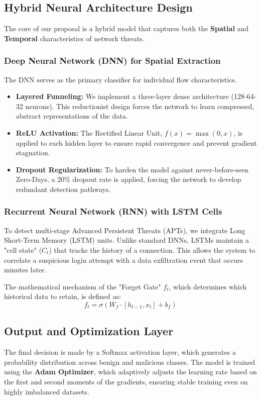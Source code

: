 \documentclass[10pt, conference, compsocconf, letterpaper, twocolumn, twoside]{IEEEtran}
\begin{document}
\subsection{Hybrid Neural Architecture Design}
The core of our proposal is a hybrid model that captures both the \textbf{Spatial} and \textbf{Temporal} characteristics of network threats.

\subsubsection{Deep Neural Network (DNN) for Spatial Extraction}
The DNN serves as the primary classifier for individual flow characteristics. 
\begin{itemize}
    \item \textbf{Layered Funneling:} We implement a three-layer dense architecture (128-64-32 neurons). This reductionist design forces the network to learn compressed, abstract representations of the data.
    \item \textbf{ReLU Activation:} The Rectified Linear Unit, $f(x) = \max(0, x)$, is applied to each hidden layer to ensure rapid convergence and prevent gradient stagnation.
    \item \textbf{Dropout Regularization:} To harden the model against never-before-seen Zero-Days, a 20\% dropout rate is applied, forcing the network to develop redundant detection pathways.
\end{itemize}

\subsubsection{Recurrent Neural Network (RNN) with LSTM Cells}
To detect multi-stage Advanced Persistent Threats (APTs), we integrate Long Short-Term Memory (LSTM) units. Unlike standard DNNs, LSTMs maintain a "cell state" ($C_t$) that tracks the history of a connection. This allows the system to correlate a suspicious login attempt with a data exfiltration event that occurs minutes later. 

The mathematical mechanism of the "Forget Gate" $f_t$, which determines which historical data to retain, is defined as:
\begin{equation}
f_t = \sigma(W_f \cdot [h_{t-1}, x_t] + b_f)
\end{equation}

\subsection{Output and Optimization Layer}
The final decision is made by a Softmax activation layer, which generates a probability distribution across benign and malicious classes. The model is trained using the \textbf{Adam Optimizer}, which adaptively adjusts the learning rate based on the first and second moments of the gradients, ensuring stable training even on highly imbalanced datasets.
\end{document}
